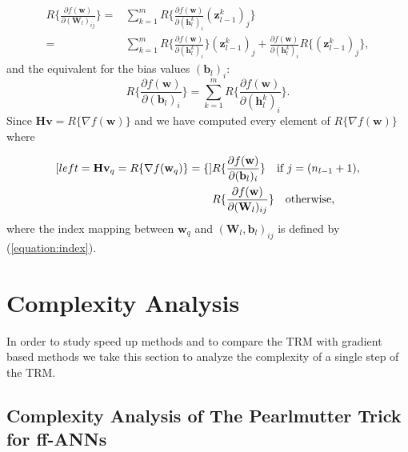 \documentclass[letterpaper,12pt,titlepage,oneside,final]{book}
\begin{document}
	\begin{equation}
	\begin{split}
	R\{\frac{\partial{f(\mathbf{w})}}{\partial{(\mathbf{W}_{l})_{ij}}}\} = & \sum_{k=1}^{m}{R\{\frac{\partial{f(\mathbf{w})}}{\partial{(\mathbf{h}_{l}^{k})_{i}}}(\mathbf{z}_{l-1}^{k})_{j}\}} \\
	= & \sum_{k=1}^{m}{ R\{\frac{\partial{f(\mathbf{w})}}{\partial{(\mathbf{h}_{l}^{k})_{i}}}\}(\mathbf{z}_{l-1}^{k})_{j} + \frac{\partial{f(\mathbf{w})}}{\partial{(\mathbf{h}_{l}^{k})_{i}}}R\{(\mathbf{z}_{l-1}^{k})_{j}\}},
	\label{equation:hv_w}
	\end{split}
	\end{equation}
	and the equivalent for the bias values $(\mathbf{b}_{l})_{i}$:
	\begin{equation}
	R\{\frac{\partial{f(\mathbf{w})}}{\partial{(\mathbf{b}_{l})_{i}}}\} = \sum_{k=1}^{m}{ R\{\frac{\partial{f(\mathbf{w})}}{\partial{(\mathbf{h}_{l}^{k})_{i}}}\}}. 
	\label{equation:hv_b}
	\end{equation}
	Since $\mathbf{Hv} = R\{\nabla{f(\mathbf{w})}\}$  and we have computed every element of $R\{\nabla{f(\mathbf{w})}\}$ where
	
	\begin{subequations}
		\begin{align}[left = {\mathbf{Hv}_{q} =R\{\nabla{f(\mathbf{w}_{q})}\} =  \empheqlbrace\,}]
		& R\{\frac{\partial{f(\mathbf{w})}}{\partial{(\mathbf{b}_{l})_{i}}}\}  \quad \text{if} \ j = (n_{l-1} + 1), \\
		& R\{\frac{\partial{f(\mathbf{w})}}{\partial{(\mathbf{W}_{l})_{ij}}}\} \quad  \text{otherwise},
		\end{align}
		\label{equation:biasindex}
	\end{subequations}
	where the index mapping between $\mathbf{w}_{q}$ and $(\mathbf{W}_{l},\mathbf{b}_{l})_{ij}$ is defined by (\ref{equation:index}).
	
	\section{Complexity Analysis}
	
	In order to study speed up methods and to compare the TRM with gradient based methods we take this section to analyze the complexity of a single step of the TRM. 
	
	\subsection{Complexity Analysis of The Pearlmutter Trick for ff-ANNs}
	
\end{document}
